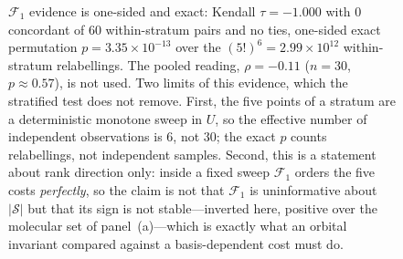 \begin{figure}[tp]
{$\mathcal F_1$ evidence is one-sided and exact: Kendall $\tau=-1.000$ with $0$ concordant of
$60$ within-stratum pairs and no ties, one-sided exact permutation $p=3.35\times10^{-13}$ over
the $(5!)^6=2.99\times10^{12}$ within-stratum relabellings. The pooled reading, $\rho=-0.11$ ($n=30$, $p\approx0.57$), is not used.
Two limits of this evidence, which the stratified test does not remove. First, the five points
of a stratum are a deterministic monotone sweep in $U$, so the effective number of independent
observations is $6$, not $30$; the exact $p$ counts relabellings, not independent samples.
Second, this is a statement about rank direction only: inside a fixed sweep $\mathcal F_1$
orders the five costs \emph{perfectly}, so the claim is not that $\mathcal F_1$ is uninformative
about $|\mathcal S|$ but that its sign is not stable---inverted here, positive over the
molecular set of panel~(a)---which is exactly what an orbital invariant compared against a
basis-dependent cost must do.}
\end{figure}

